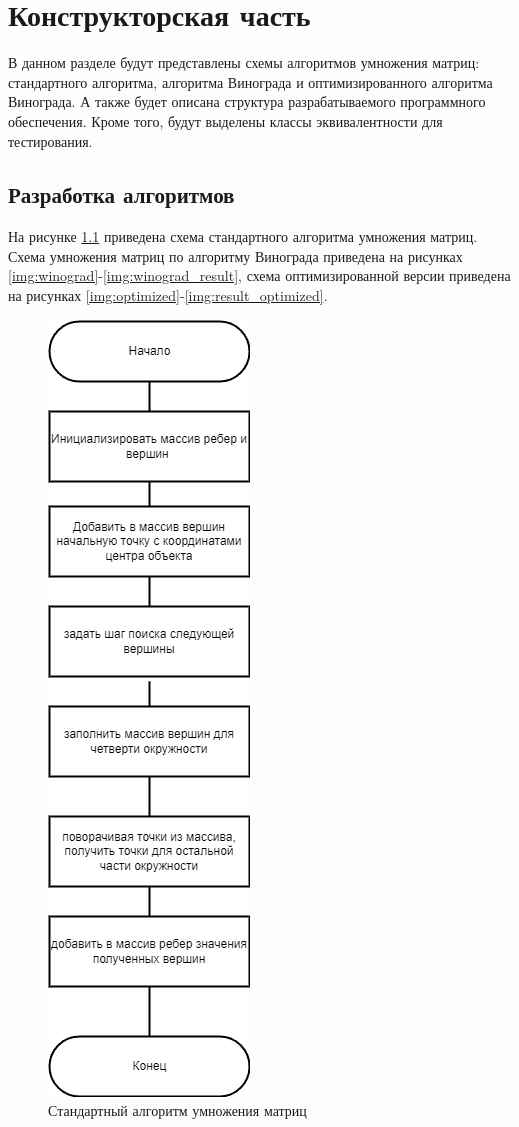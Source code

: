 \chapter{Конструкторская часть}

В данном разделе будут представлены схемы алгоритмов умножения матриц: стандартного алгоритма, алгоритма Винограда и оптимизированного алгоритма Винограда. А также будет описана структура разрабатываемого программного обеспечения. Кроме того, будут выделены классы эквивалентности для тестирования.

\section{Разработка алгоритмов}

На рисунке \ref{img:standard} приведена схема стандартного алгоритма умножения матриц. 
Схема умножения матриц по алгоритму Винограда приведена на рисунках \ref{img:winograd}-\ref{img:winograd_result}, схема оптимизированной версии приведена на рисунках \ref{img:optimized}-\ref{img:result_optimized}.

\begin{figure}[H]
	\begin{center}
		\includegraphics[scale=0.6]{img/standard.png}
	\end{center}
	\captionsetup{justification=centering}
	\caption{Стандартный алгоритм умножения матриц}
	\label{img:standard}
\end{figure}

